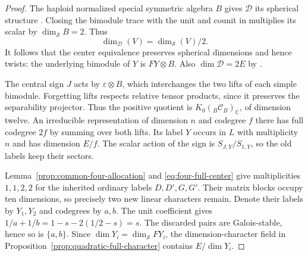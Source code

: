 \documentclass[11pt,reqno]{amsart}
\theoremstyle{remark}\newtheorem{remark}[theorem]{Remark}
\numberwithin{equation}{section}
\begin{document}
\begin{proof}
The haploid normalized special symmetric algebra $B$ gives
$\mathcal D$ its spherical structure \cite[\S3.10, after (70)]{MuleviciusOrb}.
Closing the bimodule trace with the unit and counit in
\cite[(2.16)]{KMRS} multiplies its scalar by $\dim_{\mathcal S}B=2$.
Thus
\begin{equation}\label{eq:quadratic-bimodule-trace}
        \dim_{\mathcal D}(V)=\dim_{\mathcal S}(V)/2 .
\end{equation}
It follows that the center equivalence preserves spherical dimensions
and hence twists: the underlying bimodule of $Y$ is $FY\otimes B$.
Also $\dim\mathcal D=2E$ by \cite[Theorem~2.15]{ENO}.

The central sign $J$ acts by $\varepsilon\otimes B$, which interchanges
the two lifts of each simple bimodule. Forgetting lifts respects
relative tensor products, since it preserves the separability projector.
Thus the positive quotient is $K_0({}_B\mathcal C_B)_{\mathbb C}$,
of dimension twelve. An irreducible representation of dimension $n$
and codegree $f$ there has full codegree $2f$ by summing over both
lifts. Its label $Y$ occurs in $L$ with multiplicity $n$ and has
dimension $E/f$. The scalar action of the sign is $S_{J,Y}/S_{1,Y}$,
so the old labels keep their sectors.

Lemma~\ref{prop:common-four-allocation} and \eqref{eq:four-full-center}
give multiplicities $1,1,2,2$ for the inherited ordinary labels
$D,D',G,G'$. Their matrix blocks occupy ten dimensions, so precisely
two new linear characters remain. Denote their labels by $Y_1,Y_2$
and codegrees by $a,b$. The unit coefficient gives
$1/a+1/b=1-s-2(1/2-s)=s$. The discarded pairs are Galois-stable,
hence so is $\{a,b\}$. Since $\dim Y_i=\dim_{\mathcal S}FY_i$, the dimension-character
field in Proposition~\ref{prop:quadratic-full-character} contains
$E/\dim Y_i$.
\end{proof}
\end{document}
